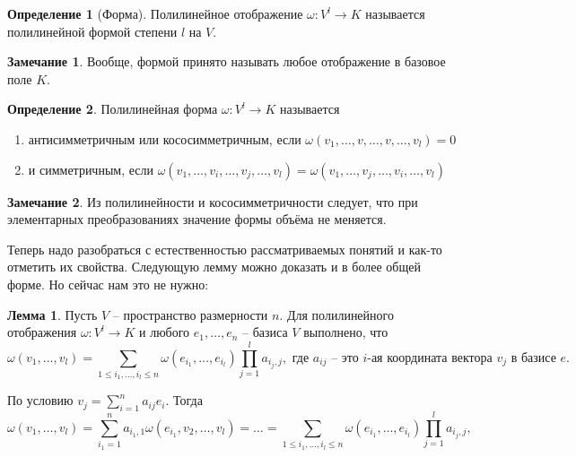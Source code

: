 \documentclass[10pt,a4paper,oneside]{book}
\theoremstyle{definition}
\newtheorem*{rem}{\color{green!50!blue}Замечание}
\newtheorem*{defn}{\color{yellow!30!red} Определение}
\newtheorem{lem}{\color{green!50!black}Лемма}
\renewcommand{\leq}{\leqslant}
\def\dfn{\begin{defn}}
\def\edfn{\end{defn}}
\def\lm{\begin{lem}}
\def\elm{\end{lem}}
\def\rm{\begin{rem}}
\def\erm{\end{rem}}
\def\enm{\begin{enumerate}}
\def\eenm{\end{enumerate}}
\begin{document}
\dfn[Форма]
Полилинейное отображение $\omega \colon  V^l\to K $ называется полилинейной формой степени $l$ на $V$.
\edfn

\rm Вообще, формой принято называть любое отображение в базовое поле $K$.
\erm


\dfn
Полилинейная форма $\omega \colon V^l\to K $ называется
\enm 
\item антисимметричным или кососимметричным, если
$\omega(v_1,\dots,v,\dots,v,\dots, v_l)=0$
\item и симметричным, если $\omega(v_1,\dots,v_i,\dots,v_j,\dots, v_l)=\omega(v_1,\dots,v_j,\dots,v_i,\dots, v_l)$
\eenm
\edfn

\rm Из полилинейности и кососимметричности следует, что при элементарных преобразованиях значение формы объёма не меняется.
\erm



Теперь надо разобраться с естественностью рассматриваемых понятий и как-то отметить их свойства. Следующую лемму можно доказать и в более общей форме. Но сейчас нам это не нужно:

\lm Пусть $V$ -- пространство размерности $n$. Для  полилинейного отображения $\omega \colon V^l \to K $ и любого $e_1,\dots,e_n$ -- базиса $V$  выполнено, что
$$\omega(v_1,\dots,v_l)=\sum_{1\leq i_1,\dots,i_l\leq n}\omega(e_{i_1},\dots,e_{i_l})\prod_{j=1}^l a_{i_j,j}, \text{ где $a_{ij}$ -- это $i$-ая координата вектора $v_j$ в базисе $e$.}$$ 
\elm
\proof По условию $v_j=\sum_{i=1}^n a_{ij}e_i$. Тогда $$\omega(v_1,\dots,v_l)=\sum_{i_1=1}^n a_{i_1,1}\omega(e_{i_1},v_2,\dots,v_l)= \dots = \sum_{1\leq i_1,\dots,i_l\leq n}\omega(e_{i_1},\dots,e_{i_l})\prod_{j=1}^l a_{i_j,j},$$
\endproof
\end{document}
